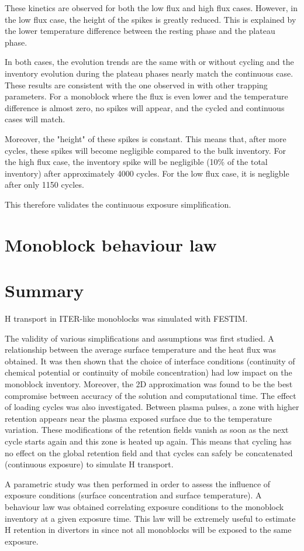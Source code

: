 These kinetics are observed for both the low flux and high flux cases.
However, in the low flux case, the height of the spikes is greatly reduced.
This is explained by the lower temperature difference between the resting phase and the plateau phase.

In both cases, the evolution trends are the same with or without cycling and the inventory evolution during the plateau phases nearly match the continuous case.
These results are consistent with the one observed in  with other trapping parameters.
For a monoblock where the flux is even lower and the temperature difference is almost zero, no spikes will appear, and the cycled and continuous cases will match.

Moreover, the "height" of these spikes is constant.
This means that, after more cycles, these spikes will become negligible compared to the bulk inventory.
For the high flux case, the inventory spike will be negligible (10\% of the total inventory) after approximately 4000 cycles.
For the low flux case, it is negligble after only 1150 cycles.

This therefore validates the continuous exposure simplification.


\section{Monoblock behaviour law}



\section{Summary}
H transport in ITER-like monoblocks was simulated with FESTIM.

The validity of various simplifications and assumptions was first studied.
A relationship between the average surface temperature and the heat flux was obtained.
It was then shown that the choice of interface conditions (continuity of chemical potential or continuity of mobile concentration) had low impact on the monoblock inventory.
Moreover, the 2D approximation was found to be the best compromise between accuracy of the solution and computational time.
The effect of loading cycles was also investigated.
Between plasma pulses, a zone with higher retention appears near the plasma exposed surface due to the temperature variation.
These modifications of the retention fields vanish as soon as the next cycle starts again and this zone is heated up again.
This means that cycling has no effect on the global retention field and that cycles can safely be concatenated (continuous exposure) to simulate H transport.

A parametric study was then performed in order to assess the influence of exposure conditions (surface concentration and surface temperature).
A behaviour law was obtained correlating exposure conditions to the monoblock inventory at a given exposure time.
This law will be extremely useful to estimate H retention in divertors in  since not all monoblocks will be exposed to the same exposure.
